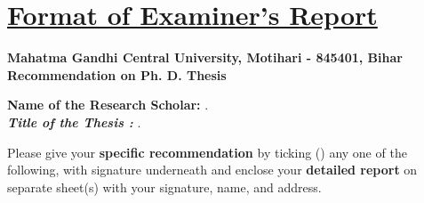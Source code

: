 \chapter*{\uline{Format of Examiner's Report}}

\begin{center} 
\textbf{\normalsize Mahatma Gandhi Central University, Motihari - 845401, Bihar} \\ 
\textbf{\normalsize Recommendation on Ph. D. Thesis} 
\end{center} 
\vspace{-.75cm} 
\begin{flushleft} 
\textbf{Name of the Research Scholar: }\sAuthor . \\
\textbf{\textit{Title of the Thesis : }}\Titel .
\end{flushleft} 
\vspace{-.25cm}
Please give your \textbf{specific recommendation} by ticking (\checkmark) any one of the following, with signature underneath and enclose your \textbf{detailed report} on separate sheet(s) with your signature, name, and address.\vspace{-.25cm}

